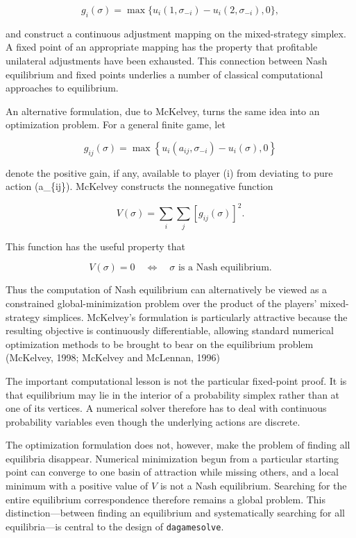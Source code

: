 \documentclass[11pt]{article}
\begin{document}
\[
g_i(\sigma)
=
\max\{u_i(1,\sigma_{-i})-u_i(2,\sigma_{-i}),0\},
\]

and construct a continuous adjustment mapping on the mixed-strategy
simplex. A fixed point of an appropriate mapping has the property that
profitable unilateral adjustments have been exhausted. This connection
between Nash equilibrium and fixed points underlies a number of
classical computational approaches to equilibrium.

An alternative formulation, due to McKelvey, turns the same idea into an
optimization problem. For a general finite game, let

\[
g_{ij}(\sigma)
=
\max\left\{
u_i(a_{ij},\sigma_{-i})-u_i(\sigma),0
\right\}
\]

denote the positive gain, if any, available to player (i) from deviating
to pure action (a\_\{ij\}). McKelvey constructs the nonnegative function

\[
V(\sigma) =\sum_i\sum_j[g_{ij}(\sigma)]^2.
\]

This function has the useful property that

\[
V(\sigma)=0
\quad\Longleftrightarrow\quad
\sigma\text{ is a Nash equilibrium}.
\]

Thus the computation of Nash equilibrium can alternatively be viewed as
a constrained global-minimization problem over the product of the
players' mixed-strategy simplices. McKelvey's formulation is
particularly attractive because the resulting objective is continuously
differentiable, allowing standard numerical optimization methods to be
brought to bear on the equilibrium problem (McKelvey, 1998; McKelvey and
McLennan, 1996)

The important computational lesson is not the particular fixed-point
proof. It is that equilibrium may lie in the interior of a probability
simplex rather than at one of its vertices. A numerical solver therefore
has to deal with continuous probability variables even though the
underlying actions are discrete.

The optimization formulation does not, however, make the problem of
finding all equilibria disappear. Numerical minimization begun from a
particular starting point can converge to one basin of attraction while
missing others, and a local minimum with a positive value of \(V\) is
not a Nash equilibrium. Searching for the entire equilibrium
correspondence therefore remains a global problem. This
distinction---between finding an equilibrium and systematically
searching for all equilibria---is central to the design of
\texttt{dagamesolve}.
\end{document}

